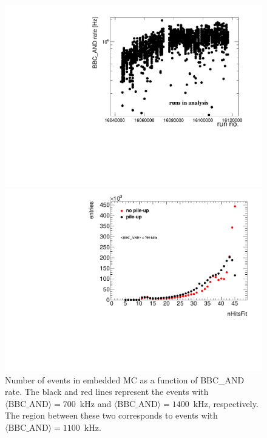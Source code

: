 \begin{figure}[H]%
	\centering%
	\begin{minipage}{.4725\textwidth}%
		\centering%
		\hspace*{-20pt}\includegraphics[width=1.1\linewidth,page=5]{graphics/systematicsEfficiency/bbc_and/Out.pdf}\vspace{-10pt}%
			\caption[Number of events in embedded MC as a function of BBC\_AND rate.]
			{Number of events in embedded MC as a function of BBC\_AND rate. The black and red lines represent the events with \mbox{$\langle\text{BBC\_AND}\rangle=700$~kHz} and \mbox{$\langle\text{BBC\_AND}\rangle=1400$~kHz},  respectively. The region between these two corresponds to events with \mbox{$\langle\text{BBC\_AND}\rangle=1100$~kHz}.}\label{fig:events_bbc_and}%
	\end{minipage}%
	\quad\quad%
	\begin{minipage}{.4725\textwidth}%
		\centering\vspace{-1em}%
		\hspace*{-20pt}\includegraphics[width=1.1\linewidth,page=4]{graphics/systematicsEfficiency/bbc_and/meanNHits.pdf}\vspace{-10pt}%

\end{minipage}
\end{figure}
